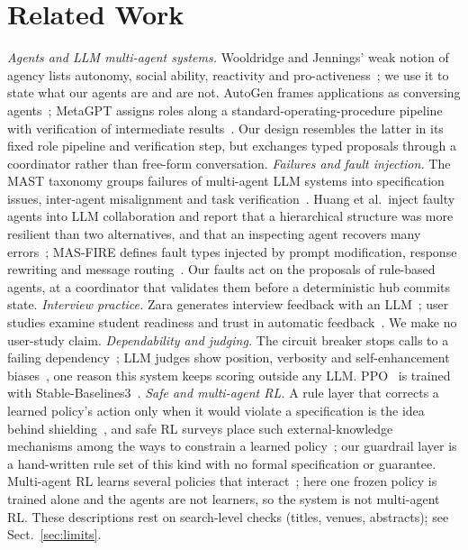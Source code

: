 \section{Related Work}
\emph{Agents and LLM multi-agent systems.} Wooldridge and Jennings' weak notion of agency lists autonomy, social ability, reactivity and pro-activeness~\cite{wj95}; we use it to state what our agents are and are not. AutoGen frames applications as conversing agents~\cite{autogen}; MetaGPT assigns roles along a standard-operating-procedure pipeline with verification of intermediate results~\cite{metagpt}. Our design resembles the latter in its fixed role pipeline and verification step, but exchanges typed proposals through a coordinator rather than free-form conversation. \emph{Failures and fault injection.} The MAST taxonomy groups failures of multi-agent LLM systems into specification issues, inter-agent misalignment and task verification~\cite{mast}. Huang et al.\ inject faulty agents into LLM collaboration and report that a hierarchical structure was more resilient than two alternatives, and that an inspecting agent recovers many errors~\cite{resil}; MAS-FIRE defines fault types injected by prompt modification, response rewriting and message routing~\cite{masfire}. Our faults act on the proposals of rule-based agents, at a coordinator that validates them before a deterministic hub commits state. \emph{Interview practice.} Zara generates interview feedback with an LLM~\cite{zara}; user studies examine student readiness and trust in automatic feedback~\cite{virt,chase}. We make no user-study claim. \emph{Dependability and judging.} The circuit breaker stops calls to a failing dependency~\cite{nygard}; LLM judges show position, verbosity and self-enhancement biases~\cite{judge}, one reason this system keeps scoring outside any LLM. PPO~\cite{ppo} is trained with Stable-Baselines3~\cite{sb3}. \emph{Safe and multi-agent RL.} A rule layer that corrects a learned policy's action only when it would violate a specification is the idea behind shielding~\cite{shield}, and safe RL surveys place such external-knowledge mechanisms among the ways to constrain a learned policy~\cite{safe}; our guardrail layer is a hand-written rule set of this kind with no formal specification or guarantee. Multi-agent RL learns several policies that interact~\cite{marl}; here one frozen policy is trained alone and the agents are not learners, so the system is not multi-agent RL. These descriptions rest on search-level checks (titles, venues, abstracts); see Sect.~\ref{sec:limits}.
